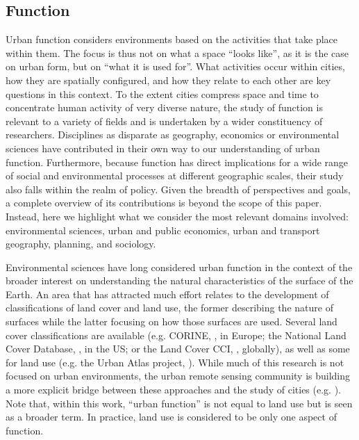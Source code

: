 \subsection{Function}
\label{sec:lit_function}


Urban function considers environments based on the activities that take place
within them.
%
The focus is thus not on what a space ``looks
like'', as it is the case on urban form, but on ``what it is used for''. What
activities occur within cities, how they are spatially configured, and how
they relate to each other are key questions in this context.
%
To the extent cities compress space and time to concentrate human activity of
very diverse nature, the study of function is relevant to a variety of
fields and is undertaken by a wider constituency of researchers. Disciplines
as disparate as geography, economics or environmental sciences have contributed in their own way to our understanding of urban
function.
Furthermore, because function has direct implications for a wide range of
social and environmental processes at different geographic scales, their study
also falls within the realm of policy.
%
Given the breadth of perspectives and goals, a complete overview of its
contributions is beyond
the scope of this paper. Instead, here we highlight what we consider the
most relevant domains involved: environmental
sciences, urban and public economics, urban and transport geography, planning, and
sociology.

Environmental sciences have long considered urban function
in the context of the broader interest on understanding the natural
characteristics of the surface of the Earth.
An area that has attracted much effort relates to the development of
classifications of land cover and land use, the former describing the nature of
surfaces while the latter focusing on how those surfaces are used. Several
land cover classifications are available (e.g. CORINE,
        \citealp{europeanenvironmentagency1990}, in Europe;
the National Land Cover Database, \citealp{homer2012national}, in the US; or
the Land Cover CCI, \citealp{defourny2012land}, globally), as well as some
for land use (e.g. the Urban Atlas project, \citealp{urban_atlas}).
While much of this research is not focused on urban environments, the urban
remote sensing community \citep{weng2018urban} is building a more explicit
bridge between these approaches and the study of cities
(e.g. \citealp{kuffer2016slums, georganos2018very, JOCHEM2018104, prasad2015remotely, stark2020satellite}).
Note that, within this work, ``urban function'' is not equal to land use but is seen as a broader term.
In practice, land use is considered to be only one aspect of function.

